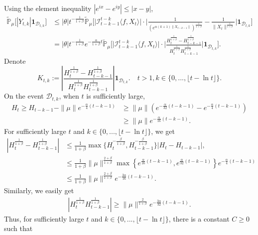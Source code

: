 \documentclass[12pt,oneside,english]{amsart}
\theoremstyle{plain}
\theoremstyle{definition}
\numberwithin{equation}{section}
\begin{document}
    Using the element inequality $|e^{ix}-e^{iy}|\leq|x-y|$,
    \begin{align}
        \mathbb{\tilde{P}}_{\mu}\big[|Y_{t,k}|\mathbf{1}_{\mathcal{D}_{t,k}}\big]&\leq|\theta|t^{-\frac{1}{1+\beta}}\mathbb{\tilde{P}}_{\mu}\Big[\big|\mathcal I_{t-k-1}^{t-k}\langle f ,X_t\rangle\big|\cdot\Big|\frac{1}{\left(e^{\alpha(k+1)\|X_{t-k-1}\|}\right)^{\frac{1}{1+\beta}}}-\frac{1}{\|X_t\|^{\frac{1}{1+\beta}}}\Big|\mathbf{1}_{\mathcal{D}_{t,k}}\Big]\\
        \label{ineq: control of Ykt}
        &=|\theta|t^{-\frac{1}{1+\beta}}e^{-\frac{\alpha}{1+\beta}t}\mathbb{\tilde{P}}_{\mu}\Big[\big|\mathcal I_{t-k-1}^{t-k}\langle f ,X_t\rangle\big|\cdot\Big|\frac{H_t^{\frac{1}{1+\beta}}-H_{t-k-1}^{\frac{1}{1+\beta}}}{H_t^{\frac{1}{1+\beta}}H_{t-k-1}^{\frac{1}{1+\beta}}}\Big|\mathbf{1}_{\mathcal{D}_{t,k}}\Big].
    \end{align}
Denote
$$K_{t,k}:=\left|\frac{H_t^{\frac{1}{1+\beta}}-H_{t-k-1}^{\frac{1}{1+\beta}}}{H_t^{\frac{1}{1+\beta}}H_{t-k-1}^{\frac{1}{1+\beta}}}\right|\mathbf{1}_{\mathcal{D}_{t,k}}.\quad t>1, k\in \{0,...,\lfloor t-\ln t\rfloor\}.$$
 On the event $\mathcal{D}_{t,k}$, when $t$ is sufficiently large,
 \begin{align*}
     H_t\geq H_{t-k-1}-\|\mu\| e^{-\frac{\alpha}{4}(t-k-1)}&\geq\|\mu\|\left(e^{-\frac{\alpha}{32}(t-k-1)}-e^{-\frac{\alpha}{4}(t-k-1)}\right)\\
     &\geq \|\mu\| e^{-\frac{\alpha}{16}(t-k-1)}.
 \end{align*}
 For sufficiently large $t$ and $k\in \{0,...,\lfloor t-\ln t\rfloor\}$, we get
 \begin{align*}
     \left|H_t^{\frac{1}{1+\beta}}-H_{t-k-1}^{\frac{1}{1+\beta}}\right|
     &\leq \frac{1}{1+\beta}\max \Big\{H_t^{-\frac{\beta}{1+\beta}},H_{t-k-1}^{-\frac{\beta}{1+\beta}}\Big\}\left|H_t-H_{t-k-1}\right|,
    \\&\leq \frac{1}{1+\beta}\|\mu\|^{\frac{2+\beta}{1+\beta}} \max\left\{e^{\frac{\alpha}{16}(t-k-1)}, e^{\frac{\alpha}{32}(t-k-1)}\right\}e^{-\frac{\alpha}{4}(t-k-1)}\\
    &\leq\frac{1}{1+\beta}\|\mu\|^{\frac{2+\beta}{1+\beta}}  e^{-\frac{3\alpha}{16}(t-k-1)}.
\end{align*}
Similarly, we easily get
\begin{align*}
    \left|H_t^{\frac{1}{1+\beta}}H_{t-k-1}^{\frac{1}{1+\beta}}\right|\geq \|\mu\|^{\frac{2}{1+\beta}} e^{-\frac{3\alpha}{32}(t-k-1)}.
\end{align*}
Thus, for sufficiently large  $t$ and $k\in \{0,...,\lfloor t-\ln t\rfloor\}$, there is a constant $C\geq 0$ such that
\end{document}
